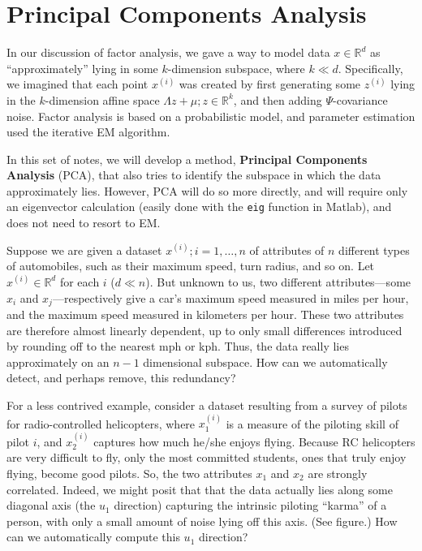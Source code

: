 \titlespacing*{\part}{0pt}{-20pt}{30pt} %
\titlespacing*{\chapter}{0pt}{-10pt}{30pt}

\part{Principal Components Analysis}
\label{part:pca}


In our discussion of factor analysis, we gave a way to model data $x \in \mathbb R^d$ as
``approximately'' lying in some $k$-dimension subspace, where $k \ll d$. Specifically, we imagined that each point $x^{(i)}$ was created by first generating some $z^{(i)}$
lying in the $k$-dimension affine space ${\Lambda z + \mu; z \in \mathbb R^k}$, and then adding
$\Psi$-covariance noise. Factor analysis is based on a probabilistic model, and
parameter estimation used the iterative EM algorithm.

In this set of notes, we will develop a method, \textbf{Principal Components
Analysis} (PCA), that also tries to identify the subspace in which the data
approximately lies. However, PCA will do so more directly, and will require
only an eigenvector calculation (easily done with the \texttt{eig} function in Matlab),
and does not need to resort to EM.

Suppose we are given a dataset ${x^{(i)}; i = 1, \ldots, n}$ of attributes of $n$ different types of automobiles, such as their maximum speed, turn radius, and
so on. Let $x^{(i)} \in \mathbb R^d$ for each $i$ ($d \ll n$). But unknown to us, two different
attributes---some $x_i$ and $x_j$---respectively give a car's maximum speed measured in miles per hour, and the maximum speed measured in kilometers per
hour. These two attributes are therefore almost linearly dependent, up to
only small differences introduced by rounding off to the nearest mph or kph.
Thus, the data really lies approximately on an $n - 1$ dimensional subspace.
How can we automatically detect, and perhaps remove, this redundancy?

For a less contrived example, consider a dataset resulting from a survey of
pilots for radio-controlled helicopters, where $x^{(i)}_1$
is a measure of the piloting
skill of pilot $i$, and $x^{(i)}_2$
captures how much he/she enjoys flying. Because
RC helicopters are very difficult to fly, only the most committed students,
ones that truly enjoy flying, become good pilots. So, the two attributes
$x_1$ and $x_2$ are strongly correlated. Indeed, we might posit that that the
data actually lies along some diagonal axis (the $u_1$ direction) capturing the %
intrinsic piloting ``karma'' of a person, with only a small amount of noise
lying off this axis. (See figure.) How can we automatically compute this $u_1$
direction?

